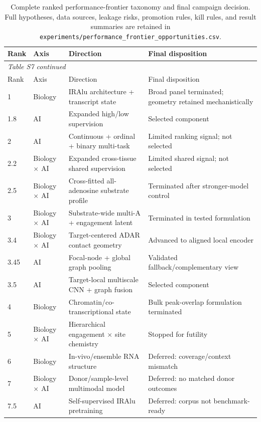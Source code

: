 \begin{longtable}{p{}p{}p{}p{}}
\caption{Complete ranked performance-frontier taxonomy and final campaign decision. Full hypotheses, data sources, leakage risks, promotion rules, kill rules, and result summaries are retained in \texttt{experiments/performance\_frontier\_opportunities.csv}.}\label{tab:taxonomy}\\
\toprule
Rank & Axis & Direction & Final disposition \\
\midrule
\endfirsthead
\multicolumn{4}{l}{\textit{Table S7 continued}}\\
\toprule
Rank & Axis & Direction & Final disposition \\
\midrule
\endhead
1 & Biology & IRAlu architecture + transcript state & Broad panel terminated; geometry retained mechanistically \\
1.8 & AI & Expanded high/low supervision & Selected component \\
2 & AI & Continuous + ordinal + binary multi-task & Limited ranking signal; not selected \\
2.2 & Biology $\times$ AI & Expanded cross-tissue shared supervision & Limited shared signal; not selected \\
2.5 & Biology $\times$ AI & Cross-fitted all-adenosine substrate profile & Terminated after stronger-model control \\
3 & Biology $\times$ AI & Substrate-wide multi-A + engagement latent & Terminated in tested formulation \\
3.4 & Biology $\times$ AI & Target-centered ADAR contact geometry & Advanced to aligned local encoder \\
3.45 & AI & Focal-node + global graph pooling & Validated fallback/complementary view \\
3.5 & AI & Target-local multiscale CNN + graph fusion & Selected component \\
4 & Biology & Chromatin/co-transcriptional state & Bulk peak-overlap formulation terminated \\
5 & Biology $\times$ AI & Hierarchical engagement $\times$ site chemistry & Stopped for futility \\
6 & Biology & In-vivo/ensemble RNA structure & Deferred: coverage/context mismatch \\
7 & Biology $\times$ AI & Donor/sample-level multimodal model & Deferred: no matched donor outcomes \\
7.5 & AI & Self-supervised IRAlu pretraining & Deferred: corpus not benchmark-ready \\

\end{longtable}
